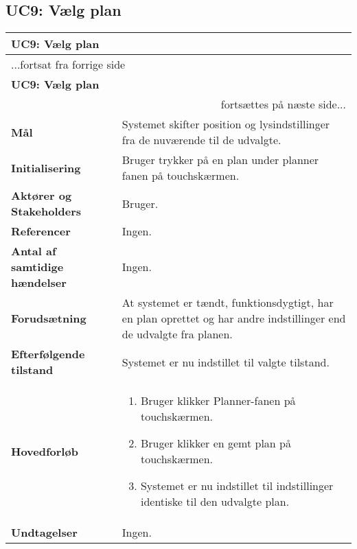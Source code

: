 \subsection{UC9: Vælg plan}

\begin{center} \centering
	\begin{longtable}{|p{6cm}|p{8cm}|}
	\hline
		\multicolumn{2}{|l|}{\textbf{UC9: Vælg plan}} \\\hline
		\endfirsthead
		
		\multicolumn{2}{l}{...fortsat fra forrige side} \\ \hline 
		\multicolumn{2}{|l|}{\textbf{UC9: Vælg plan}} \\\hline
		\endhead		

        \multicolumn{2}{r}{fortsættes på næste side...} \\
        \endfoot
        \endlastfoot
        
        \textbf{Mål}								
            & Systemet skifter position og lysindstillinger fra de nuværende til de udvalgte.
        \\ \hline
        \textbf{Initialisering}					
            & Bruger trykker på en plan under planner fanen på touchskærmen.
        \\ \hline
        \textbf{Aktører og Stakeholders}			
            & Bruger.
        \\ \hline
        \textbf{Referencer}						
            & Ingen.
        \\ \hline
        \textbf{Antal af samtidige hændelser}	
            & Ingen.
        \\ \hline
        \textbf{Forudsætning}					
            & At systemet er tændt, funktionsdygtigt, har en plan oprettet og har andre indstillinger end de udvalgte fra planen.
        \\ \hline
        \textbf{Efterfølgende tilstand}			
            & Systemet er nu indstillet til valgte tilstand.
        \\ \hline
        \textbf{Hovedforløb}						
            &
            \begin{enumerate}
                \item Bruger klikker Planner-fanen på touchskærmen.
                \item Bruger klikker en gemt plan på touchskærmen.
                \item Systemet er nu indstillet til indstillinger identiske til den udvalgte plan.
            \end{enumerate}
        \\ \hline
        \textbf{Undtagelser}						
            & Ingen.
        \\ \hline
	\end{longtable}
	\label{UC9} 
\end{center}